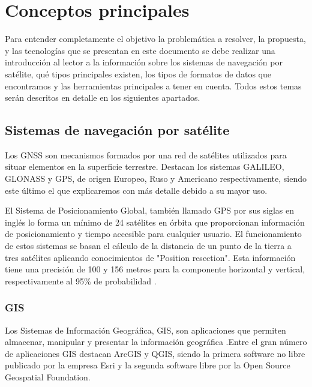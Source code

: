 

\chapter{Conceptos principales}
Para entender completamente el objetivo la problemática a resolver, la propuesta, 
y las tecnologías que se presentan en este documento se debe realizar una introducción al 
lector a la información sobre los sistemas de navegación por satélite, qué tipos principales
existen, los tipos de formatos de datos que encontramos y las herramientas principales a 
tener en cuenta. Todos estos temas serán descritos en detalle en los siguientes apartados.

\section{Sistemas de navegación por satélite}
Los \ac{GNSS} son mecanismos formados por una red de satélites utilizados 
para situar elementos en la superficie terrestre. Destacan los sistemas GALILEO, GLONASS y GPS,
de origen Europeo, Ruso y Americano respectivamente, siendo este último el que explicaremos 
con más detalle debido a su mayor uso.

El Sistema de Posicionamiento Global, también llamado \ac{GPS} por sus siglas en inglés 
lo forma un mínimo de 24 satélites en órbita que proporcionan información de posicionamiento y tiempo 
accesible para cualquier usuario. El funcionamiento de estos sistemas se basan el cálculo de la 
distancia de un punto de la tierra a tres satélites aplicando conocimientos de "Position resection". \cite{Langley01}
Esta información tiene una precisión de 100 y 156 metros para la componente horizontal y vertical, 
respectivamente al 95$\%$ de probabilidad \cite{ElRabbany01}.

\subsection{GIS}
Los Sistemas de Información Geográfica, \ac{GIS},  son aplicaciones que permiten almacenar, manipular y presentar la información geográfica \cite{EPA01}.Entre el gran número de aplicaciones GIS destacan ArcGIS y QGIS, siendo la primera software no libre publicado por la empresa Esri y la segunda software libre por la Open Source Geospatial Foundation.

